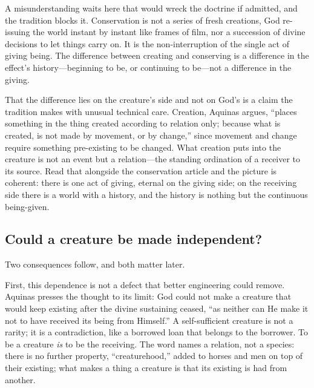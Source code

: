 A misunderstanding waits here that would wreck the doctrine if admitted, and the tradition blocks it. Conservation is not a series of fresh creations, God re-issuing the world instant by instant like frames of film, nor a succession of divine decisions to let things carry on. It is the non-interruption of the single act of giving being. The difference between creating and conserving is a difference in the effect's history---beginning to be, or continuing to be---not a difference in the giving.

That the difference lies on the creature's side and not on God's is a claim the tradition makes with unusual technical care. Creation, Aquinas argues, ``places something in the thing created according to relation only; because what is created, is not made by movement, or by change,'' since movement and change require something pre-existing to be changed. What creation puts into the creature is not an event but a relation---the standing ordination of a receiver to its source. Read that alongside the conservation article and the picture is coherent: there is one act of giving, eternal on the giving side; on the receiving side there is a world with a history, and the history is nothing but the continuous being-given.

\subsection{Could a creature be made independent?}

Two consequences follow, and both matter later.

First, this dependence is not a defect that better engineering could remove. Aquinas presses the thought to its limit: God could not make a creature that would keep existing after the divine sustaining ceased, ``as neither can He make it not to have received its being from Himself.'' A self-sufficient creature is not a rarity; it is a contradiction, like a borrowed loan that belongs to the borrower. To be a creature \emph{is} to be the receiving. The word names a relation, not a species: there is no further property, ``creaturehood,'' added to horses and men on top of their existing; what makes a thing a creature is that its existing is had from another.

